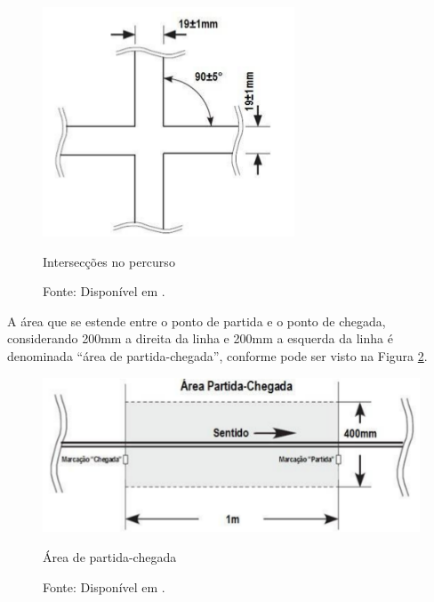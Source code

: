 \begin{figure}[h!]
 \centering
 \captionsetup{width=0.37\textwidth,font=footnotesize,textfont=bf}
 \includegraphics[scale=0.6]{figuras/Percurso1.png}
 \caption{Intersecções no percurso \label{fig:percurso1}}
 \vspace{-0.3cm}
 \caption*{Fonte: Disponível em \cite[p.4]{RegrasRobocore}.}
\end{figure}


 A área que se estende entre o ponto de partida e o ponto de chegada, considerando 200mm a direita da linha e 
 200mm a esquerda da linha
 é denominada ``área de partida-chegada'', conforme pode ser visto na Figura \ref{fig:percurso2}.\par
 

\vspace{0.6cm}
\begin{figure}[h!]
 \centering
 \captionsetup{width=0.55\textwidth,font=footnotesize,textfont=bf}
 \includegraphics[scale=0.5]{figuras/Percurso2.png}
 \caption{Área de partida-chegada \label{fig:percurso2}}
  \vspace{-0.3cm}
 \caption*{Fonte: Disponível em \cite[p.4]{RegrasRobocore}.}
\end{figure}



